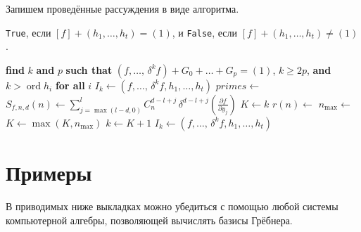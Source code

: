 \documentclass[11pt]{article}
\DeclareMathOperator{\ord}{ord}
\renewcommand{\ge}{\geqslant}
\theoremstyle{plain1}
\theoremstyle{plain2}
\theoremstyle{plain}
\theoremstyle{plain3}
\theoremstyle{definition}
\theoremstyle{remark}
\begin{document}
\bigskip

Запишем проведённые рассуждения в виде алгоритма.

\begin{algorithm}

 \verb'True', если  $[f]+(h_1,\ldots,h_t)=(1)$, и \verb'False', если $[f]+(h_1,\ldots,h_t)\ne(1)$.
\begin{algorithmic}[1]
\Statex
\State\label{find} {\bf find} $k$ {\bf and} $p$ {\bf such that} $(f, \ldots, \,\delta^k f) + G_0 + \ldots + G_p = (1)$, $k \ge 2p$, {\bf and} $k > \ord h_i$ {\bf for all} $i$
\State $I_k \gets (f, \ldots, \,\delta^k f, h_1, \ldots, h_t)$
  \label{subset}
  \EndIf
  \State\label{primes} $primes \gets$ 
  \State $S_{f,n,d}(n) \gets \sum_{j=\max(l-d,0)}^l C_{n}^{d-l+j} \,\delta^{d-l+j}\left(\frac{\partial f}{\partial y_{j}}\right)$
  \State $K \gets k$
    \State\label{remainder} $r(n) \gets$ 
    \State $n_{\max} \gets$ 
      \State\label{return_false} 
    \EndIf
    \State $K \gets \max(K, n_{\max})$
  \EndFor
  \State $k \gets K + 1$
  \State $I_k \gets (f, \ldots, \,\delta^k f, h_1, \ldots, h_t)$
\EndFor
\State {}
\end{algorithmic}
\end{algorithm}


\bigskip

\section{Примеры}
В приводимых ниже выкладках можно убедиться с помощью любой системы компьютерной алгебры, позволяющей вычислять базисы Грёбнера.
\end{document}

